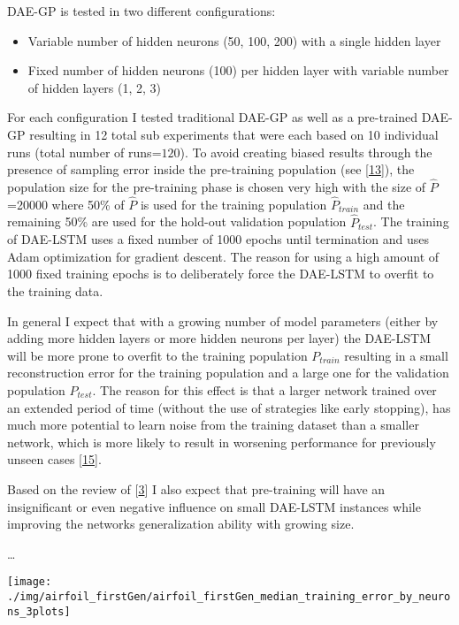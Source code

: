 \documentclass[
  11pt,
]{article}
\providecommand{\tightlist}{%
  \setlength{\itemsep}{0pt}\setlength{\parskip}{0pt}}
\let\origfigure\figure
\let\endorigfigure\endfigure
\renewenvironment{figure}[1][2] {
    \expandafter\origfigure\expandafter[H]
} {
    \endorigfigure
}
\begin{document}
DAE-GP is tested in two different configurations:

\begin{itemize}
\tightlist
\item
  Variable number of hidden neurons (50, 100, 200) with a single hidden layer
\item
  Fixed number of hidden neurons (100) per hidden layer with variable number of hidden layers (1, 2, 3)
\end{itemize}

For each configuration I tested traditional DAE-GP as well as a pre-trained DAE-GP resulting in 12 total sub experiments that were each based on 10 individual runs (total number of runs=\(120\)). To avoid creating biased results through the presence of sampling error inside the pre-training population (see {[}\protect\hyperlink{ref-sampling_err_gp}{13}{]}), the population size for the pre-training phase is chosen very high with the size of \(\hat{P}\) =20000 where 50\% of \(\hat{P}\) is used for the training population \(\hat{P}_{train}\) and the remaining 50\% are used for the hold-out validation population \(\hat{P}_{test}\). The training of DAE-LSTM uses a fixed number of 1000 epochs until termination and uses Adam optimization for gradient descent. The reason for using a high amount of 1000 fixed training epochs is to deliberately force the DAE-LSTM to overfit to the training data.

In general I expect that with a growing number of model parameters (either by adding more hidden layers or more hidden neurons per layer) the DAE-LSTM will be more prone to overfit to the training population \(P_{train}\) resulting in a small reconstruction error for the training population and a large one for the validation population \(P_{test}\). The reason for this effect is that a larger network trained over an extended period of time (without the use of strategies like early stopping), has much more potential to learn noise from the training dataset than a smaller network, which is more likely to result in worsening performance for previously unseen cases {[}\protect\hyperlink{ref-weigend1994overfitting}{15}{]}.

Based on the review of {[}\protect\hyperlink{ref-pmlr-v5-erhan09a}{3}{]} I also expect that pre-training will have an insignificant or even negative influence on small DAE-LSTM instances while improving the networks generalization ability with growing size.

\ldots{}

\begin{figure}[c]

{\centering \texttt{[image: ./img/airfoil\_firstGen/airfoil\_firstGen\_median\_training\_error\_by\_neurons\_3plots]} 

}

\caption{First Generation Median Training Error for variable number of hidden Neurons}\label{fig:first-gen-airfoil-byNeurons}
\end{figure}
\end{document}
